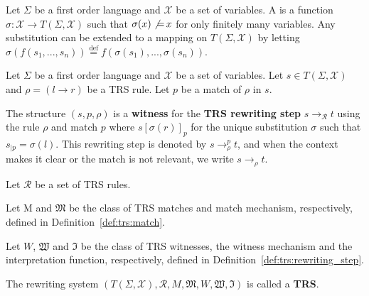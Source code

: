   \begin{definition}[Substitution]
    Let $\Sigma$ be a first order language and $\mathcal{X}$ be a set of variables.
    A  is a function $\sigma : \mathcal{X} \mathop{\rightarrow} T(\Sigma, \mathcal{X})$ such that $\sigma(x) \not \mathop{=} x$ for only finitely many variables. Any substitution can be extended to a mapping on $T(\Sigma,\mathcal{X})$ by letting $\sigma(f(s_1,...,s_n)) \overset{\operatorname{def}}{=}f(\sigma(s_1),...,\sigma(s_n))$.
  \end{definition}

   
  \begin{definition}
    \label{def:trs:rewriting_step}
    Let $\Sigma$ be a first order language and $\mathcal{X}$ be a set of variables. Let $s \mathop{\in} T(\Sigma, \mathcal{X})$ and $\rho \mathop{=} (l \mathop{\to} r)$ be a TRS rule. Let $p$ be a match of $\rho$ in $s$.

    The structure $(s, p, \rho)$ is a \textbf{witness} for the \textbf{TRS rewriting step} $s \mathop{\to} _\mathcal{R} t$ using the rule $\rho$ and match $p$
     where $s[\sigma(r)]_p$ for the unique substitution $\sigma$ such that $s_{|p} \mathop{=} \sigma(l)$. This rewriting step is denoted by $s \mathop{\to} ^p_\rho t$, and when the context makes it clear or the match is not relevant, we write $s \mathop{\to} _\rho t$.
  \end{definition}
  
  \begin{definition}
    Let $\mathcal{R}$ be a set of TRS rules. 

    Let M and $\mathfrak{M}$ be the class of TRS matches and match mechanism, respectively, defined in Definition~\ref{def:trs:match}. 

    Let $W$, $\mathfrak{W}$ and $\mathfrak{I}$ be the class of TRS witnesses, the witness mechanism and the interpretation function, respectively, defined in Definition~\ref{def:trs:rewriting_step}.

    The rewriting system $(T(\Sigma,\mathcal{X}), \mathcal{R}, M, \mathfrak{M}, W, \mathfrak{W}, \mathfrak{I})$ is called a \textbf{TRS}.
  \end{definition}

